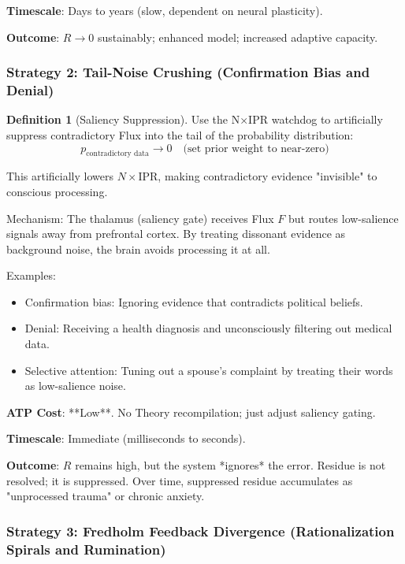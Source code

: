 \documentclass[11pt,oneside]{article}
\theoremstyle{definition}
\newtheorem{definition}[theorem]{Definition}
\begin{document}
\textbf{Timescale}: Days to years (slow, dependent on neural plasticity).

\textbf{Outcome}: $R \to 0$ sustainably; enhanced model; increased adaptive capacity.

\subsubsection{Strategy 2: Tail-Noise Crushing (Confirmation Bias and Denial)}

\begin{definition}[Saliency Suppression]
Use the N×IPR watchdog to artificially suppress contradictory Flux into the tail of the probability distribution:
\[
p_{\text{contradictory data}} \to 0 \quad \text{(set prior weight to near-zero)}
\]

This artificially lowers $N \times \text{IPR}$, making contradictory evidence "invisible" to conscious processing.

Mechanism: The thalamus (saliency gate) receives Flux $F$ but routes low-salience signals away from prefrontal cortex. By treating dissonant evidence as background noise, the brain avoids processing it at all.
\end{definition}

Examples:
\begin{itemize}
  \item Confirmation bias: Ignoring evidence that contradicts political beliefs.
  \item Denial: Receiving a health diagnosis and unconsciously filtering out medical data.
  \item Selective attention: Tuning out a spouse's complaint by treating their words as low-salience noise.
\end{itemize}

\textbf{ATP Cost}: **Low**. No Theory recompilation; just adjust saliency gating.

\textbf{Timescale}: Immediate (milliseconds to seconds).

\textbf{Outcome}: $R$ remains high, but the system *ignores* the error. Residue is not resolved; it is suppressed. Over time, suppressed residue accumulates as "unprocessed trauma" or chronic anxiety.

\subsubsection{Strategy 3: Fredholm Feedback Divergence (Rationalization Spirals and Rumination)}
\end{document}
